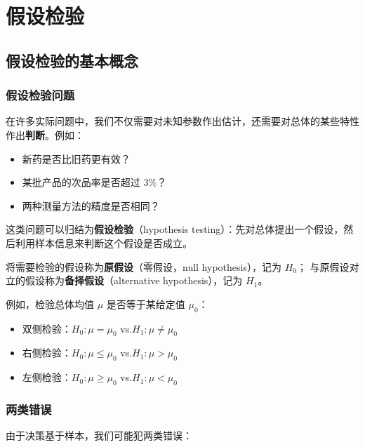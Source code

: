 \chapter{假设检验}

\section{假设检验的基本概念}

\subsection{假设检验问题}

在许多实际问题中，我们不仅需要对未知参数作出估计，还需要对总体的某些特性作出\textbf{判断}。例如：
\begin{itemize}
    \item 新药是否比旧药更有效？
    \item 某批产品的次品率是否超过 $3\%$？
    \item 两种测量方法的精度是否相同？
\end{itemize}

这类问题可以归结为\textbf{假设检验}（hypothesis testing）：先对总体提出一个假设，然后利用样本信息来判断这个假设是否成立。

\begin{definition}[原假设与备择假设]
将需要检验的假设称为\textbf{原假设}（零假设，null hypothesis），记为 $H_0$；
与原假设对立的假设称为\textbf{备择假设}（alternative hypothesis），记为 $H_1$。
\end{definition}

例如，检验总体均值 $\mu$ 是否等于某给定值 $\mu_0$：
\begin{itemize}
    \item 双侧检验：$H_0: \mu = \mu_0$ \quad vs.\quad $H_1: \mu \neq \mu_0$
    \item 右侧检验：$H_0: \mu \le \mu_0$ \quad vs.\quad $H_1: \mu > \mu_0$
    \item 左侧检验：$H_0: \mu \ge \mu_0$ \quad vs.\quad $H_1: \mu < \mu_0$
\end{itemize}

\subsection{两类错误}

由于决策基于样本，我们可能犯两类错误：

